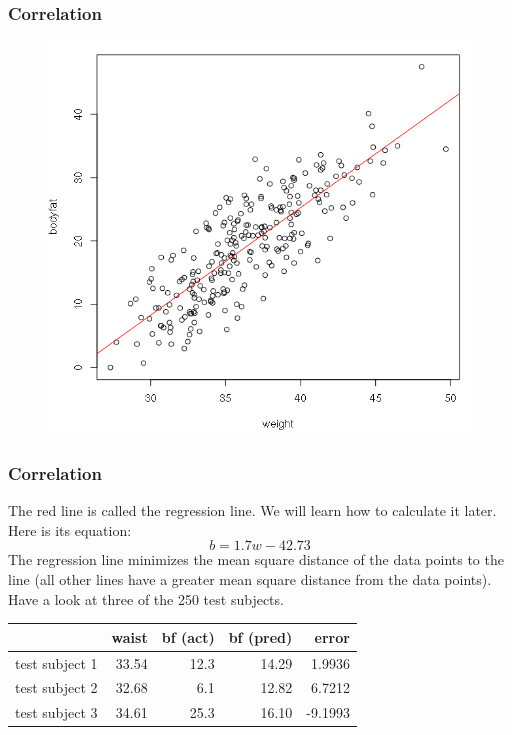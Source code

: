 \documentclass[xcolor=dvipsnames]{beamer}
\begin{document}
\begin{frame}
  \frametitle{Correlation}
\begin{figure}[h]
\includegraphics[scale=.35]{./diagrams/bf-03.png}
\end{figure}
\end{frame}

\begin{frame}
  \frametitle{Correlation}
  The red line is called the regression line. We will learn how to
  calculate it later. Here is its equation:
\begin{equation}
  \label{eq:chuitohf}
  b=1.7w-42.73
\end{equation}
The regression line minimizes the mean square distance of the data
points to the line (all other lines have a greater mean square
distance from the data points). Have a look at three of the 250 test
subjects.

\begin{tabular}{|l|r|r|r|r|}\hline
                 & waist & bf (act) & bf (pred) & error   \\ \hline
  test subject 1 & 33.54 & 12.3     & 14.29     & 1.9936  \\ \hline
  test subject 2 & 32.68 & 6.1      & 12.82     & 6.7212  \\ \hline
  test subject 3 & 34.61 & 25.3     & 16.10     & -9.1993 \\ \hline
\end{tabular}
\end{frame}
\end{document}
